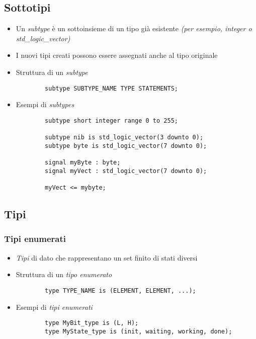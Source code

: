 \documentclass{article}
\begin{document}
\subsection{Sottotipi}
\begin{itemize}
	\item Un \textit{subtype} è un sottoinsieme di un tipo già esistente \textit{(per esempio, integer o std\_logic\_vector)}
	\item I nuovi tipi creati possono essere assegnati anche al tipo originale
	\item Struttura di un \textit{subtype}
	      \begin{verbatim}
	    subtype SUBTYPE_NAME TYPE STATEMENTS;
	      \end{verbatim}
	\item Esempi di \textit{subtypes}
	      \begin{verbatim}
	    subtype short integer range 0 to 255;
		
	    subtype nib is std_logic_vector(3 downto 0);
	    subtype byte is std_logic_vector(7 downto 0);
		
	    signal myByte : byte;
	    signal myVect : std_logic_vector(7 downto 0);
		
	    myVect <= mybyte;
	      \end{verbatim}
\end{itemize}
\subsection{Tipi}
\subsubsection{Tipi enumerati}
\begin{itemize}
	\item \textit{Tipi} di dato che rappresentano un set finito di stati diversi
	\item Struttura di un \textit{tipo enumerato}
	      \begin{verbatim}
	    type TYPE_NAME is (ELEMENT, ELEMENT, ...);
	      \end{verbatim}
	\item Esempi di \textit{tipi enumerati}
	      \begin{verbatim}
	    type MyBit_type is (L, H);
	    type MyState_type is (init, waiting, working, done);
	      \end{verbatim}
\end{itemize}
\end{document}
